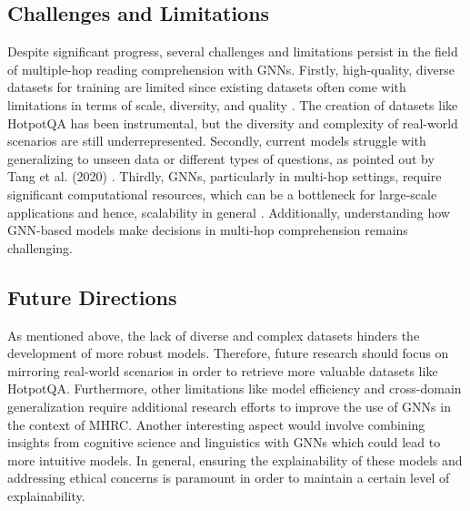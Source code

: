 \documentclass[sigplan,screen,nonacm]{acmart}
\begin{document}
\subsection{Challenges and Limitations}
Despite significant progress, several challenges and limitations persist in the field of multiple-hop reading comprehension with GNNs.
Firstly, high-quality, diverse datasets for training are limited since existing datasets often come with limitations in terms of scale, 
diversity, and quality \cite{RN214}. The creation of datasets like HotpotQA has been instrumental, but the diversity and complexity of real-world 
scenarios are still underrepresented. Secondly, current models struggle with generalizing to unseen data or different types of questions, as 
pointed out by Tang et al. (2020) \cite{RN215}. Thirdly, GNNs, particularly in multi-hop settings, require significant computational resources, 
which can be a bottleneck for large-scale applications and hence, scalability in general \cite{RN216}. Additionally, understanding how GNN-based 
models make decisions in multi-hop comprehension remains challenging.

\subsection{Future Directions}
As mentioned above, the lack of diverse and complex datasets hinders the development of more robust models. Therefore, future research should 
focus on mirroring real-world scenarios in order to retrieve more valuable datasets like HotpotQA. Furthermore, other limitations like model efficiency and 
cross-domain generalization require additional research efforts to improve the use of GNNs in the context of MHRC. Another interesting aspect would 
involve combining insights from cognitive science and linguistics with GNNs which could lead to more intuitive models. In general, 
ensuring the explainability of these models and addressing ethical concerns is paramount in order to maintain a certain level of explainability. 



\end{document}
